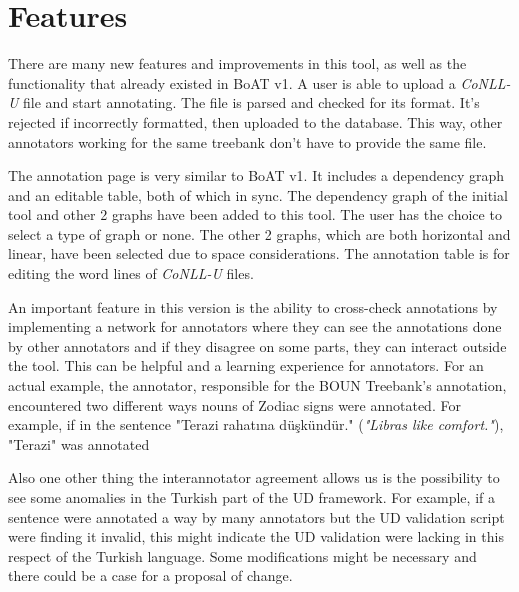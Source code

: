 \section{Features}
\label{sec:features}

There are many new features and improvements in this tool, as well as the functionality that already existed in BoAT v1.
A user is able to upload a \textit{CoNLL-U} file and start annotating.
The file is parsed and checked for its format. It's rejected if incorrectly formatted, then uploaded to the database.
This way, other annotators working for the same treebank don't have to provide the same file.

The annotation page is very similar to BoAT v1.
It includes a dependency graph and an editable table, both of which in sync.
The dependency graph of the initial tool and other 2 graphs have been added to this tool.
The user has the choice to select a type of graph or none.
The other 2 graphs, which are both horizontal and linear, have been selected due to space considerations.
The annotation table is for editing the word lines of \textit{CoNLL-U} files.

An important feature in this version is the ability to cross-check annotations by implementing a network for annotators where they can see the annotations done by other annotators and if they disagree on some parts, they can interact outside the tool.
This can be helpful and a learning experience for annotators.
For an actual example, the annotator, responsible for the BOUN Treebank's annotation, encountered two different ways nouns of Zodiac signs were annotated.
For example, if in the sentence "Terazi rahatına düşkündür." (\textit{"Libras like comfort."}), "Terazi" was annotated

Also one other thing the interannotator agreement allows us is the possibility to see some anomalies in the Turkish part of the UD framework.
For example, if a sentence were annotated a way by many annotators but the UD validation script were finding it invalid, this might indicate the UD validation were lacking in this respect of the Turkish language.
Some modifications might be necessary and there could be a case for a proposal of change.
